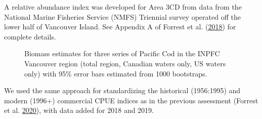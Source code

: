 \documentclass[11pt]{book}
\begin{document}
\hypertarget{nmfs-triennial-survey-in-canadian-waters}{%
\label{nmfs-triennial-survey-in-canadian-waters}}

A relative abundance index was developed for Area 3CD from data from the National Marine Fisheries Service (NMFS) Triennial survey operated off the lower half of Vancouver Island. See Appendix A of Forrest et al. (\protect\hyperlink{ref-forrest2018}{2018}) for complete details.
\begin{figure}[htb]

{\centering {} 

}

\caption{Biomass estimates for three series of Pacific Cod in the INPFC Vancouver region (total region, Canadian waters only, US waters only) with 95\% error bars estimated from 1000 bootstraps.}\label{fig:tri-fig9}
\end{figure}
\clearpage

\clearpage


\clearpage

\label{app:cpue-appendix}

We used the same approach for standardizing the historical (1956:1995) and modern (1996+) commercial CPUE indices as in the previous assessment (Forrest et al. \protect\hyperlink{ref-forrest2020}{2020}), with data added for 2018 and 2019.
\end{document}
